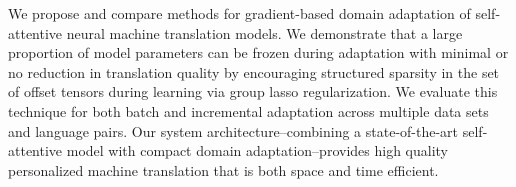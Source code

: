 We propose and compare methods for gradient-based domain adaptation of self-attentive neural machine translation models. We demonstrate that a large proportion of model parameters can be frozen during adaptation with minimal or no reduction in translation quality by encouraging structured sparsity in the set of offset tensors during learning via group lasso regularization. We evaluate this technique for both batch and incremental adaptation across multiple data sets and language pairs. Our system architecture--combining a state-of-the-art self-attentive model with compact domain adaptation--provides high quality personalized machine translation that is both space and time efficient.
